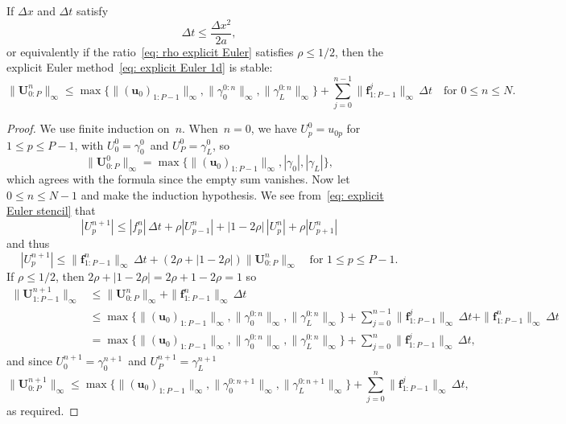 \begin{theorem}\label{thm: explicit Euler stability}
If $\Delta x$ and $\Delta t$ satisfy
\begin{equation}\label{eq: explicit Euler timestep}
\Delta t\le\frac{\Delta x^2}{2a},                                        
\end{equation}
or equivalently if the ratio~\eqref{eq: rho explicit Euler} satisfies 
$\rho\le1/2$, then the explicit Euler method~\eqref{eq: explicit Euler 1d} is 
stable:
\[
\|\boldsymbol{U}^n_{0:P}\|_\infty
	\le\max\bigl\{\|(\boldsymbol{u}_0)_{1:P-1}\|_\infty, 
		\|\gamma_0^{0:n}\|_\infty,\|\gamma_L^{0:n}\|_\infty\bigr\}
	+\sum_{j=0}^{n-1}\|\boldsymbol{f}^j_{1:P-1}\|_\infty\,\Delta t
\quad\text{for $0\le n\le N$.}
\]
\end{theorem}
\begin{proof}
We use finite induction on~$n$.  When~$n=0$, we have
$U^0_p=u_{0p}$ for~$1\le p\le P-1$, with $U^0_0=\gamma_0^0$~and 
$U^0_P=\gamma_L^0$, so 
\[
\|\boldsymbol{U}^0_{0:P}\|_\infty=
\max\bigl\{\|(\boldsymbol{u}_0)_{1:P-1}\|_\infty,|\gamma_0|,|\gamma_L|\bigr\},
\]
which agrees with the formula since the empty sum vanishes. Now let 
$0\le n\le N-1$ and make the induction hypothesis.  We see 
from~\eqref{eq: explicit Euler stencil} that
\[
|U^{n+1}_p|\le|f^n_p|\,\Delta t+\rho|U^n_{p-1}|+|1-2\rho|\,|U^n_p|
    +\rho|U^n_{p+1}|
\]
and thus
\[
|U^{n+1}_p|\le\|\boldsymbol{f}^n_{1:P-1}\|_\infty\,\Delta t
		+(2\rho+|1-2\rho|)\|\boldsymbol{U}^n_{0:P}\|_\infty
\quad\text{for $1\le p\le P-1$.} 
\]
If $\rho\le1/2$, then $2\rho+|1-2\rho|=2\rho+1-2\rho=1$ so
\begin{align*}
\|\boldsymbol{U}^{n+1}_{1:P-1}\|_\infty
	&\le\|\boldsymbol{U}^n_{0:P}\|_\infty
		+\|\boldsymbol{f}^n_{1:P-1}\|_\infty\,\Delta t\\
	&\le\max\bigl\{\|(\boldsymbol{u}_0)_{1:P-1}\|_\infty, 
		\|\gamma_0^{0:n}\|_\infty,\|\gamma_L^{0:n}\|_\infty\bigr\}
	+\sum_{j=0}^{n-1}\|\boldsymbol{f}^j_{1:P-1}\|_\infty\,\Delta t
		+\|\boldsymbol{f}^n_{1:P-1}\|_\infty\,\Delta t\\
	&=\max\bigl\{\|(\boldsymbol{u}_0)_{1:P-1}\|_\infty, 
		\|\gamma_0^{0:n}\|_\infty,\|\gamma_L^{0:n}\|_\infty\bigr\}
	+\sum_{j=0}^n\|\boldsymbol{f}^j_{1:P-1}\|_\infty\,\Delta t,
\end{align*}
and since $U^{n+1}_0=\gamma_0^{n+1}$~and $U^{n+1}_P=\gamma_L^{n+1}$
\[
\|\boldsymbol{U}^{n+1}_{0:P}\|_\infty
	\le\max\bigl\{\|(\boldsymbol{u}_0)_{1:P-1}\|_\infty, 
		\|\gamma_0^{0:n+1}\|_\infty,\|\gamma_L^{0:n+1}\|_\infty\bigr\}
	+\sum_{j=0}^n\|\boldsymbol{f}^j_{1:P-1}\|_\infty\,\Delta t,
\]
as required.
\end{proof}

